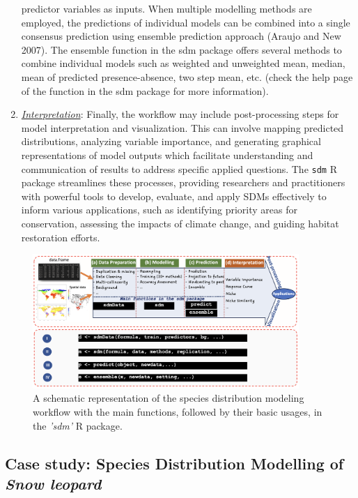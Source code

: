 \documentclass[
]{article}
\begin{document}
\begin{enumerate}
  predictor variables as inputs. When multiple modelling methods are
  employed, the predictions of individual models can be combined into a
  single consensus prediction using ensemble prediction approach (Araujo
  and New 2007). The ensemble function in the sdm package offers several
  methods to combine individual models such as weighted and unweighted
  mean, median, mean of predicted presence-absence, two step mean, etc.
  (check the help page of the function in the sdm package for more
  information).
\item
  \uline{\textit{Interpretation}}: Finally, the workflow may include
  post-processing steps for model interpretation and visualization. This
  can involve mapping predicted distributions, analyzing variable
  importance, and generating graphical representations of model outputs
  which facilitate understanding and communication of results to address
  specific applied questions. The \texttt{sdm} R package streamlines
  these processes, providing researchers and practitioners with powerful
  tools to develop, evaluate, and apply SDMs effectively to inform
  various applications, such as identifying priority areas for
  conservation, assessing the impacts of climate change, and guiding
  habitat restoration efforts.
\end{enumerate}

\begin{figure}[H]
    \centering
    \includegraphics[width=0.9\textwidth]{Fig1.png}
    \caption{A schematic representation of the species distribution modeling workflow with the main functions, followed by their basic usages, in the \textit{'sdm'} R package.}
    \label{fig:Fig1}
\end{figure}

\subsection{\texorpdfstring{Case study: Species Distribution Modelling
of
\textit{Snow leopard}}{Case study: Species Distribution Modelling of }}\label{case-study-species-distribution-modelling-of}
\end{document}
